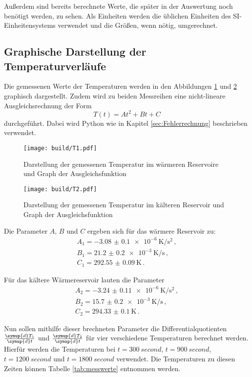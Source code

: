 Außerdem sind bereits berechnete Werte,
die später in der Auswertung noch benötigt werden, zu sehen. Als Einheiten werden
die üblichen Einheiten des SI-Einheitensystems verwendet und die Größen, wenn nötig,
umgerechnet.

\subsection{Graphische Darstellung der Temperaturverläufe}
Die gemessenen Werte der Temperaturen werden in den Abbildungen \ref{fig:temp1} und \ref{fig:temp2}
graphisch dargestellt. Zudem wird zu beiden Messreihen eine nicht-lineare
Ausgleichsrechnung der Form
\begin{equation}
  T(t)=At^2+Bt+C
\end{equation}
durchgeführt. Dabei wird Python wie in Kapitel \ref{sec:Fehlerrechnung} beschrieben
verwendet.

\begin{figure}
  \centering
  \texttt{[image: build/T1.pdf]}
  \caption{Darstellung der gemessenen Temperatur im wärmeren Reservoire
   und Graph der Ausgleichsfunktion}
  \label{fig:temp1}
\end{figure}

\begin{figure}
  \centering
  \texttt{[image: build/T2.pdf]}
  \caption{Darstellung der gemessenen Temperatur im kälteren Reservoir
   und Graph der Ausgleichsfunktion}
  \label{fig:temp2}
\end{figure}

Die Parameter $A$, $B$ und $C$ ergeben sich für das wärmere Reservoir zu:
\begin{align*}
  A_1=\SI{-3.08(010)e-6}{\kelvin\per\second\squared}  \,, \\
  B_1=\SI{21.2(02)e-3}{\kelvin\per\second} \,,  \\
  C_1=\SI{292.55(009)}{\kelvin}  \,.
\end{align*}

Für das kältere Wärmereservoir lauten die Parameter
\begin{align*}
  A_2=\SI{-3.24(011)e-6}{\kelvin\per\second\squared}  \,, \\
  B_2=\SI{15.7(02)e-3}{\kelvin\per\second} \,,  \\
  C_2=\SI{294.33(010)}{\kelvin}  \,.
\end{align*}



Nun sollen mithilfe dieser brechneten Parameter die Differentialquotienten
$\frac{\symup{d}T_1}{\symup{d}t}$ und $\frac{\symup{d}T_2}{\symup{d}t}$ für
vier verschiedene Temperaturen berechnet werden. Hierfür werden die Temperaturen
bei $t=\SI{300}{second}$, $t=\SI{900}{second}$, $t=\SI{1200}{second}$ und
$t=\SI{1800}{second}$ verwendet. Die Temperaturen zu diesen Zeiten können Tabelle
\ref{tab:messwerte} entnommen werden.

